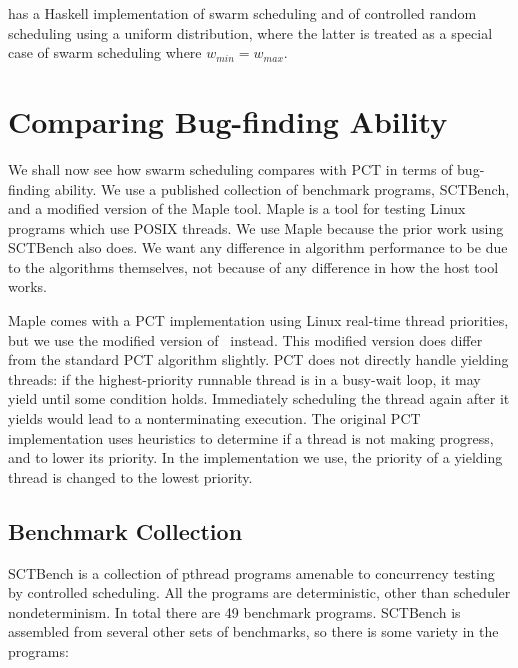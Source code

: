 \dejafu{} has a Haskell implementation of swarm scheduling and of
controlled random scheduling using a uniform distribution, where the
latter is treated as a special case of swarm scheduling where
$w_{min} = w_{max}$.

\section{Comparing Bug-finding Ability}
\label{sec:algorithms-bench}

We shall now see how swarm scheduling compares with PCT in terms of
bug-finding ability.  We use a published collection of benchmark
programs, SCTBench\cite{thomson2016,thomson2014}, and a modified
version of the Maple tool\cite{yu2012}.  Maple is a tool for testing
Linux programs which use POSIX threads\cite{ieee1995}.  We use Maple
because the prior work using SCTBench also does.  We want any
difference in algorithm performance to be due to the algorithms
themselves, not because of any difference in how the host tool works.

Maple comes with a PCT implementation using Linux real-time thread priorities,
but we use the modified version of~\cite{thomson2016} instead.  This modified
version does differ from the standard PCT algorithm slightly.  PCT does not
directly handle yielding threads: if the highest-priority runnable thread is in
a busy-wait loop, it may yield until some condition holds.  Immediately
scheduling the thread again after it yields would lead to a nonterminating
execution.  The original PCT implementation uses heuristics to determine if a
thread is not making progress, and to lower its priority\cite{burckhardt2010}.
In the implementation we use, the priority of a yielding thread is changed to
the lowest priority\cite{thomson2016}.

\subsection{Benchmark Collection}
\label{sec:algorithms-bench-sctbench}

SCTBench\cite{thomson2016,thomson2014} is a collection of pthread
programs amenable to concurrency testing by controlled scheduling.
All the programs are deterministic, other than scheduler
nondeterminism.  In total there are 49 benchmark programs.  SCTBench
is assembled from several other sets of benchmarks, so there is some
variety in the programs:

